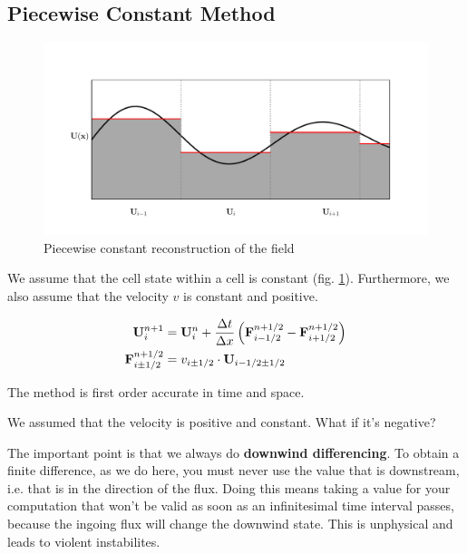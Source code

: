 \subsection{Piecewise Constant Method}

\begin{figure}[htbp]
	\includegraphics[width=\textwidth]{./figures/piecewise_const.pdf}%
	\caption{Piecewise constant reconstruction of the field
		\label{fig:pwconst}
	}
\end{figure}


We assume that the cell state within a cell is constant (fig. \ref{fig:pwconst}).
Furthermore, we also assume that the velocity $v$ is constant and positive.


\begin{align}
	\mathbf{U}_i ^{n+1} &= 
		\mathbf{U}_i^{n} +  \frac{\Delta t}{\Delta x} \left( \mathbf{F}_{i-1/2}^{n+1/2} - \mathbf{F}_{i+1/2}^{n+1/2} \right) \label{eq:advection_basic}\\ 
	\mathbf{F}_{i\pm1/2}^{n+1/2} &= v_{i\pm1/2}\cdot \mathbf{U}_{i - 1/2 \pm 1/2} \label{eq:advection_flux}
\end{align}

The method is first order accurate in time and space.





We assumed that the velocity is positive and constant.
What if it's negative?

The important point is that we always do \textbf{downwind differencing}.
To obtain a finite difference, as we do here, you must never use the value that is downstream, i.e. that is in the direction of the flux.
Doing this means taking a value for your computation that won't be valid as soon as an infinitesimal time interval passes, because the ingoing flux will change the downwind state.
This is unphysical and leads to violent instabilites.

